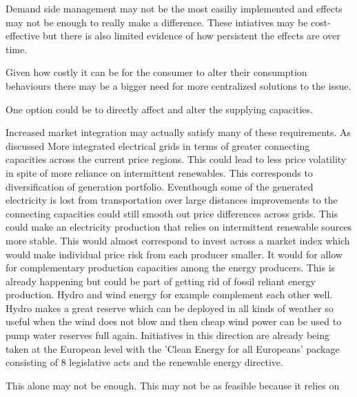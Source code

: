 Demand side management may not be the most easiliy implemented and effects may not be enough to really make a difference. These intiatives may be cost-effective but there is also limited evidence of how persistent the effects are over time.

\par %
Given how costly it can be for the consumer to alter their consumption behaviours there may be a bigger need for more centralized solutions to the issue.

One option could be to directly affect and alter the supplying capacities.

Increased market integration may actually satisfy many of these requirements. As discussed  More integrated electrical grids in terms of greater connecting capacities across the current price regions. This could lead to less price volatility in spite of more reliance on intermittent renewables. This corresponds to diversification of generation portfolio.  Eventhough some of the generated electricity is lost from transportation over large distances improvements to the connecting capacities could still smooth out price differences across grids. This could make an electricity production that relies on intermittent renewable sources more stable. This would almost correspond to invest across a market index which would make individual price risk from each producer smaller. It would for allow for complementary production capacities among the energy producers. This is already happening but could be part of getting rid of fossil reliant energy production. Hydro and wind energy for example complement each other well. Hydro makes a great reserve which can be deployed in all kinds of weather so useful when the wind does not blow and then cheap wind power can be used to pump water reserves full again. Initiatives in this direction are already being taken at the European level with the 'Clean Energy for all Europeans' package consisting of 8 legislative acts and the renewable energy directive.

This alone may not be enough. This may not be as feasible because it relies on



